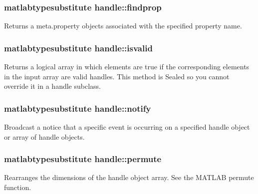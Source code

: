 \hypertarget{classhandle_ab4b410e2df940296c9d2563898c951fe}{
\subsubsection[{findprop}]{\setlength{\rightskip}{0pt plus 5cm}matlabtypesubstitute {\bf handle\-::findprop}}}\label{classhandle_ab4b410e2df940296c9d2563898c951fe}


Returns a meta.\-property objects associated with the specified property name. 

\hypertarget{classhandle_a72617e83dc9643b61ed8af63e5058ccf}{
\subsubsection[{isvalid}]{\setlength{\rightskip}{0pt plus 5cm}matlabtypesubstitute {\bf handle\-::isvalid}}}\label{classhandle_a72617e83dc9643b61ed8af63e5058ccf}


Returns a logical array in which elements are true if the corresponding elements in the input array are valid handles. This method is Sealed so you cannot override it in a handle subclass. 

\hypertarget{classhandle_a8cfc3dab9d3ecc55b0b3449c2c7afd6f}{
\subsubsection[{notify}]{\setlength{\rightskip}{0pt plus 5cm}matlabtypesubstitute {\bf handle\-::notify}}}\label{classhandle_a8cfc3dab9d3ecc55b0b3449c2c7afd6f}


Broadcast a notice that a specific event is occurring on a specified handle object or array of handle objects. 

\hypertarget{classhandle_a6dc9f59313af54f392d8e273d71ace7b}{
\subsubsection[{permute}]{\setlength{\rightskip}{0pt plus 5cm}matlabtypesubstitute {\bf handle\-::permute}}}\label{classhandle_a6dc9f59313af54f392d8e273d71ace7b}


Rearranges the dimensions of the handle object array. See the M\-A\-T\-L\-A\-B permute function. 

